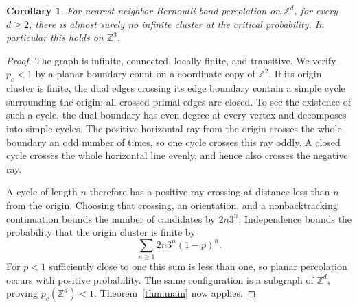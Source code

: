 \documentclass[11pt]{article}
\newtheorem{corollary}[theorem]{Corollary}
\theoremstyle{definition}
\newcommand{\pc}{p_c}
\newcommand{\Z}{\mathbb Z}
\begin{document}
\begin{corollary}
\label{cor:lattices}
For nearest-neighbor Bernoulli bond percolation on $\Z^d$, for every
$d\ge2$, there is almost surely no infinite cluster at the critical
probability. In particular this holds on $\Z^3$.
\end{corollary}

\begin{proof}
The graph is infinite, connected, locally finite, and transitive.
We verify $\pc<1$ by a planar boundary count on a coordinate copy
of $\Z^2$. If its origin cluster is finite, the dual edges crossing
its edge boundary contain a simple cycle surrounding the origin;
all crossed primal edges are closed. To see the existence of such
a cycle, the dual boundary has even degree at every vertex and
decomposes into simple cycles. The positive horizontal ray from
the origin crosses the whole boundary an odd number of times, so
one cycle crosses this ray oddly. A closed cycle crosses the whole
horizontal line evenly, and hence also crosses the negative ray.

A cycle of length $n$ therefore has a positive-ray crossing at
distance less than $n$ from the origin. Choosing that crossing,
an orientation, and a nonbacktracking continuation bounds the
number of candidates by $2n3^n$. Independence bounds the probability
that the origin cluster is finite by
\[
 \sum_{n\ge1}2n3^n(1-p)^n.
\]
For $p<1$ sufficiently close to one this sum is less than one,
so planar percolation occurs with positive probability. The same
configuration is a subgraph of $\Z^d$, proving $\pc(\Z^d)<1$.
Theorem~\ref{thm:main} now applies.
\end{proof}



\end{document}
